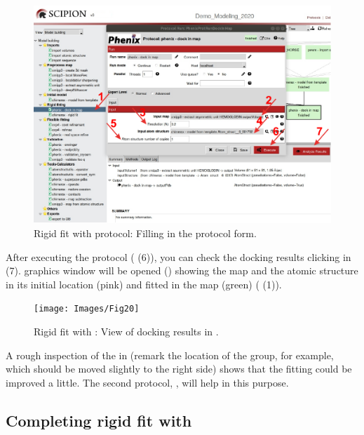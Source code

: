  \begin{figure}[H]
  \centering 
  \captionsetup{width=.9\linewidth} 
  \includegraphics[width=1\textwidth]{Images/Fig18}
  \caption{Rigid fit with  protocol: Filling in the protocol form.}
  \label{fig:dockInMap_protocol}
  \end{figure}
 
 After executing the protocol  ( (6)), you can check the docking results clicking in  (7). \chimera graphics window will be opened () showing the map and the atomic structure  in its initial location (pink) and fitted in the map (green) ( (1)). 
  
 \begin{figure}[H]
  \centering 
  \captionsetup{width=.7\linewidth} 
  \texttt{[image: Images/Fig20]}
  \caption{Rigid fit with : View of docking results in \chimera.}
  \label{fig:dockInMap_results}
  \end{figure}
 
 A rough inspection of the  in  (remark the location of the  group, for example, which should be moved slightly to the right side) shows that the fitting could be improved a little. The second protocol, , will help in this purpose.
 
 \subsection*{ Completing rigid fit with \chimera {}}
 
